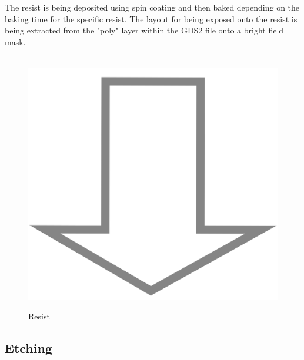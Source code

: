 The resist is being deposited using spin coating and then baked depending on the baking time for the specific resist.
The layout for being exposed onto the resist is being extracted from the "poly" layer within the GDS2 file onto a bright field mask.

\begin{figure}[H]
	\centering
	\begin{tikzpicture}[node distance = 3cm, auto, thick,scale=\CrossSectionOnly, every node/.style={transform shape}]
		
	\end{tikzpicture} \\
	\includegraphics[scale=0.01]{down_arrow.png} \\
	\begin{tikzpicture}[node distance = 3cm, auto, thick,scale=\CrossSectionOnly, every node/.style={transform shape}]
		
	\end{tikzpicture}
	\caption{Resist}
\end{figure}

\subsection{Etching}

